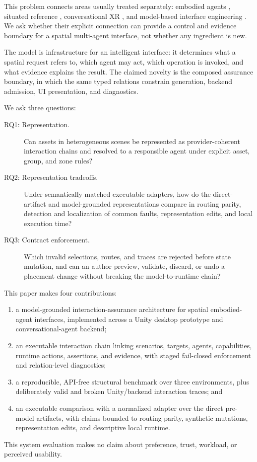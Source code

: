 This problem connects areas usually treated separately: embodied agents
\cite{cassell1999embodiment,kopp2005museum}, situated reference
\cite{gorniak2005grounding,lemaignan2012grounding}, conversational XR
\cite{delatorre2024llmr,carcangiu2025tellxr,buldu2025cuify,liu2026agenthands},
and model-based interface engineering
\cite{puerta1999framework,calvary2003cameleon,paterno2009maria}. We ask whether
their explicit connection can provide a control and evidence boundary for a
spatial multi-agent interface, not whether any ingredient is new.

The model is infrastructure for an intelligent interface: it determines what a
spatial request refers to, which agent may act, which operation is invoked, and
what evidence explains the result. The claimed novelty is the composed
assurance boundary, in which the same typed relations constrain generation,
backend admission, UI presentation, and diagnostics.

We ask three questions:

\begin{description}
  \item[RQ1: Representation.] Can assets in
  heterogeneous scenes be represented as provider-coherent interaction chains
  and resolved to a responsible agent under explicit asset, group, and zone
  rules?

  \item[RQ2: Representation tradeoffs.] Under semantically matched
  executable adapters, how do the direct-artifact and model-grounded
  representations compare in routing parity, detection and localization of
  common faults, representation edits, and local execution time?

  \item[RQ3: Contract enforcement.] Which invalid
  selections, routes, and traces are rejected before state mutation, and can an
  author preview, validate, discard, or undo a placement change without
  breaking the model-to-runtime chain?
\end{description}

This paper makes four contributions:

\begin{enumerate}
  \item a model-grounded interaction-assurance architecture for spatial
  embodied-agent interfaces, implemented across a Unity desktop prototype and
  conversational-agent backend;
  \item an executable interaction chain linking scenarios, targets, agents,
  capabilities, runtime actions, assertions, and evidence, with staged
  fail-closed enforcement and relation-level diagnostics;
  \item a reproducible, API-free structural benchmark over three environments,
  plus deliberately valid and broken Unity/backend interaction traces; and
  \item an executable comparison with a normalized adapter over the direct
  pre-model artifacts, with claims bounded to routing parity, synthetic
  mutations, representation edits, and descriptive local runtime.
\end{enumerate}

This system evaluation makes no claim about preference, trust, workload, or
perceived usability.
